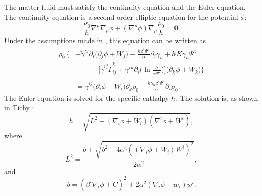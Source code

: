 The matter fluid must satisfy the continuity equation and the Euler equation. The continuity equation is a second order elliptic equation for the potential $\phi$:
\begin{equation}
\frac{\rho_0}{h}\nabla^{\mu}\nabla_{\mu}\phi+\left(\nabla^{\mu}\phi\right)\nabla_{\mu}\frac{\rho_0}{h}=0.
\end{equation}
Under the assumptions made in \cite{Tichy:2011gw}, this equation can be written as
\begin{align}
\rho_0\,\bigg\{\!\!&-\tilde{\gamma}^{ij}\partial_i\big(\partial_j\phi+W_j\big)  + \frac{h\beta^i\Psi^4}{\alpha}\partial_i\gamma_n + hK\gamma_n\Psi^4 \nonumber\\
&\qquad+\Big[\tilde{\gamma}^{ij}\tilde{\Gamma}^k_{ij}+\gamma^{ik}\partial_i\big(\ln \frac{h}{\alpha\Psi^2}\big)\Big] 
\big(\partial_k\phi+W_k\big) \bigg\} \nonumber \\
&=\tilde{\gamma}^{ij}\big(\partial_i\phi+W_i\big)\partial_j\rho_0 - \frac{h\gamma_n\beta^i\Psi^4}{\alpha}\partial_i\rho_0.
\label{eq:Continuity}
\end{align}
The Euler equation is solved for the specific enthalpy $h$. The solution is, as shown in Tichy :
\begin{equation}
h = \sqrt{L^2 -
  \left(\nabla_i\phi+W_i\right)\left(\nabla^i\phi+W^i\right)},
\end{equation}
where
\begin{equation}
L^2 =
\frac{b+\sqrt{b^2-4\alpha^4\left(\left(\nabla_i\phi+W_i\right)W^i\right)^2}}{2\alpha^2},
\end{equation}
and
\begin{equation}
b =
\left(\beta^i\nabla_i\phi+C\right)^2+2\alpha^2\left(\nabla_i\phi+w_i\right)w^i.
\end{equation}

